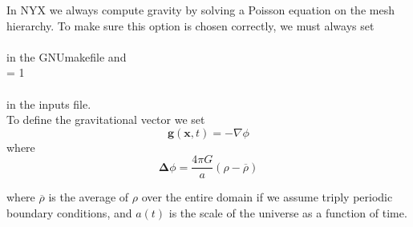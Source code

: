 In NYX we always compute gravity by solving a Poisson equation on the mesh hierarchy.
To make sure this option is chosen correctly, we must always set \\

 \\

\noindent in the GNUmakefile and \\

 = 1  \\
 \\

\noindent in the inputs file.  \\

To define the gravitational vector we set
\begin{equation}
\mathbf{g}(\mathbf{x},t) = -\nabla \phi 
\end{equation}
where 
\begin{equation}
\mathbf{\Delta} \phi = \frac{4 \pi G}{a} (\rho - \overline{\rho}) \label{eq:Self Gravity}
\end{equation}

\noindent where $\overline{\rho}$ is the average of $\rho$ over the entire domain if we assume triply periodic boundary conditions,
and $a(t)$ is the scale of the universe as a function of time.

